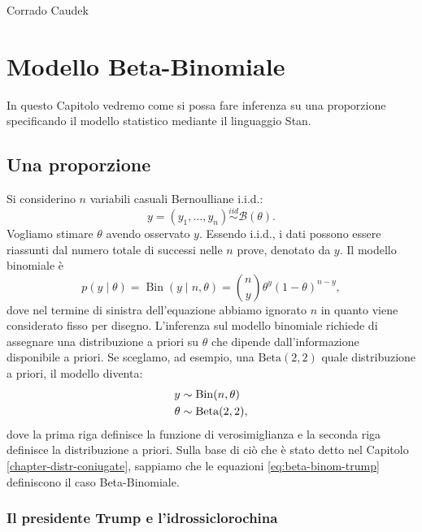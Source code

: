 \documentclass[
  10pt,
  italian,
  a4paper,
  extrafontsizes,onecolumn,openright
  ]{memoir}
\DeclareMathOperator{\Bin}{Bin} %
\begin{document}
\bigskip

Corrado Caudek

\mainmatter

\hypertarget{mod-binom}{%
\chapter{Modello Beta-Binomiale}\label{mod-binom}}

In questo Capitolo vedremo come si possa fare inferenza su una proporzione specificando il modello statistico mediante il linguaggio Stan.

\hypertarget{una-proporzione}{%
\section{Una proporzione}\label{una-proporzione}}

Si considerino \(n\) variabili casuali Bernoulliane i.i.d.:
\[
y = (y_1, \dots, y_n) \stackrel{iid}{\sim} \mathcal{B}(\theta).
\]
\noindent
Vogliamo stimare \(\theta\) avendo osservato \(y\). Essendo i.i.d., i dati possono essere riassunti dal numero totale di successi nelle \(n\) prove, denotato da \(y\). Il modello binomiale è
\begin{equation}
p(y \mid \theta) = \Bin(y \mid n, \theta) = \binom{n}{y}\theta^y (1 -\theta)^{n-y},
\end{equation}
\noindent
dove nel termine di sinistra dell'equazione abbiamo ignorato \(n\) in quanto viene considerato fisso per disegno. L'inferenza sul modello binomiale richiede di assegnare una distribuzione a priori su \(\theta\) che dipende dall'informazione disponibile a priori. Se sceglamo, ad esempio, una \(\mbox{Beta}(2, 2)\) quale distribuzione a priori, il modello diventa:
\begin{align}
y &\sim \Bin(n, \theta) \notag\\
\theta &\sim \mbox{Beta}(2, 2),
\label{eq:beta-binom-trump}
\end{align}
\noindent
dove la prima riga definisce la funzione di verosimiglianza e la seconda riga definisce la distribuzione a priori. Sulla base di ciò che è stato detto nel Capitolo \ref{chapter-distr-coniugate}, sappiamo che le equazioni \eqref{eq:beta-binom-trump} definiscono il caso Beta-Binomiale.

\hypertarget{il-presidente-trump-e-lidrossiclorochina}{%
\subsection{Il presidente Trump e l'idrossiclorochina}\label{il-presidente-trump-e-lidrossiclorochina}}
\end{document}
